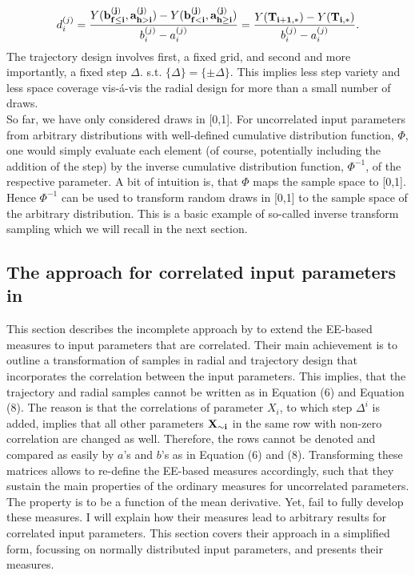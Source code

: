\documentclass[a4paper,12pt]{article}
\begin{document}
\begin{align}
d^{(j)}_i =  \frac{Y(\bold{b_{f \leq i}^{(j)}}, \bold{a_{h>i}^{(j)}}) - Y(\bold{b_{f<i}^{(j)}}, \bold{a_{h \geq i}^{(j)}})}{b_i^{(j)} - a_i^{(j)}} = \frac{Y(\bold{T_{i+1,*})} -  Y(\bold{T_{i,*}})}{b_i^{(j)} - a_i^{(j)}}.
\end{align}
The trajectory design involves first, a fixed grid, and second and more importantly, a fixed step $\Delta$. s.t. $\{\Delta\} = \{\pm \Delta\}$. This implies less step variety and less space coverage vis-á-vis the radial design for more than a small number of draws.\\

\noindent
So far, we have only considered draws in [0,1]. For uncorrelated input parameters from arbitrary distributions with well-defined cumulative distribution function, $\Phi$, one would simply evaluate each element (of course, potentially including the addition of the step) by the inverse cumulative distribution function, $\Phi^{-1}$, of the respective parameter. A bit of intuition is, that $\Phi$ maps the sample space to [0,1]. Hence $\Phi^{-1}$ can be used to transform random draws in [0,1] to the sample space of the arbitrary distribution. This is a basic example of so-called inverse transform sampling which we will recall in the next section.



\subsection{The approach for correlated input parameters in \cite{ge2017extending}}

This section describes the incomplete approach by \cite{ge2017extending} to extend the EE-based measures to input parameters that are correlated. Their main achievement is to outline a transformation of samples in radial and trajectory design that incorporates the correlation between the input parameters. This implies, that the trajectory and radial samples cannot be written as in Equation (6) and Equation (8). The reason is that the correlations of parameter $X_i$, to which step $\Delta^i$ is added, implies that all other parameters $\bold{X_{\sim i}}$ in the same row with non-zero correlation are changed as well. Therefore, the rows cannot be denoted and compared as easily by $a$'s and $b$'s as in Equation (6) and (8). Transforming these matrices allows to re-define the EE-based measures accordingly, such that they sustain the main properties of the ordinary measures for uncorrelated parameters. The property is to be a function of the mean derivative. Yet, \cite{ge2017extending} fail to fully develop these measures. I will explain how their measures lead to arbitrary results for correlated input parameters. This section covers their approach in a simplified form, focussing on normally distributed input parameters, and presents their measures.\\
\end{document}
